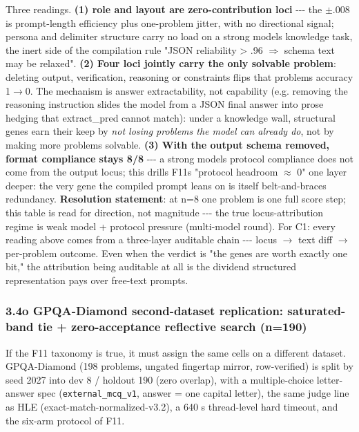 Three readings. \textbf{(1) role and layout are zero-contribution loci} -\/-\/- the \(\pm\).008 is prompt-length efficiency plus one-problem jitter, with no directional signal; persona and delimiter structure carry no load on a strong model\textquotesingle s knowledge task, the inert side of the compilation rule "JSON reliability \textgreater{} .96 \(\Rightarrow\) schema text may be relaxed". \textbf{(2) Four loci jointly carry the only solvable problem}: deleting output, verification, reasoning or constraints flips that problem\textquotesingle s accuracy 1\(\rightarrow\)0. The mechanism is answer extractability, not capability (e.g. removing the reasoning instruction slides the model from a JSON final answer into prose hedging that extract\_pred cannot match): under a knowledge wall, structural genes earn their keep by \emph{not losing problems the model can already do}, not by making more problems solvable. \textbf{(3) With the output schema removed, format compliance stays 8/8} -\/-\/- a strong model\textquotesingle s protocol compliance does not come from the output locus; this drills F11\textquotesingle s "protocol headroom \(\approx\) 0" one layer deeper: the very gene the compiled prompt leans on is itself belt-and-braces redundancy. \textbf{Resolution statement}: at n=8 one problem is one full score step; this table is read for direction, not magnitude -\/-\/- the true locus-attribution regime is weak model + protocol pressure (multi-model round). For C1: every reading above comes from a three-layer auditable chain -\/-\/- locus \(\rightarrow\) text diff \(\rightarrow\) per-problem outcome. Even when the verdict is "the genes are worth exactly one bit," the attribution being auditable at all is the dividend structured representation pays over free-text prompts.

\subsubsection{3.4o GPQA-Diamond second-dataset replication: saturated-band tie + zero-acceptance reflective search (n=190)}\label{34o-gpqa-diamond-second-dataset-replication-saturated-band-tie--zero-acceptance-reflective-search-n190}

If the F11 taxonomy is true, it must assign the same cells on a different dataset. GPQA-Diamond (198 problems, ungated fingertap mirror, row-verified) is split by seed 2027 into dev 8 / holdout 190 (zero overlap), with a multiple-choice letter-answer spec (\texttt{external\_mcq\_v1}, answer = one capital letter), the same judge line as HLE (exact-match-normalized-v3.2), a 640 s thread-level hard timeout, and the six-arm protocol of F11.

